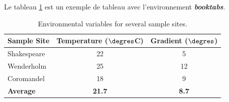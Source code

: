 \documentclass[12pt]{article} %
\begin{document}
Le tableau \ref{tab:env} est un exemple de tableau avec l'environnement \textbf{\textit{booktabs}}.

\begin{table}[!ht]
	\centering
	\begin{tabular}{lcc}
		\toprule
		\textbf{Sample Site} & \textbf{Temperature ($\degres$C)} & \textbf{Gradient ($\degres$)}\\
		\midrule
		Shakespeare & 22 & 5\\
		Wenderholm & 25 & 12\\
		Coromandel & 18 & 9\\
		\midrule
		\textbf{Average} & \textbf{21.7} & \textbf{8.7}\\
		\bottomrule
	\end{tabular}
	\caption{Environmental variables for several sample sites.}
	\label{tab:env}
\end{table}




\end{document}
